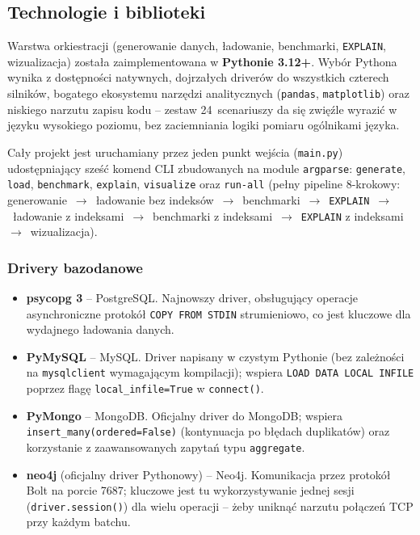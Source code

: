 \subsection{Technologie i biblioteki}

Warstwa orkiestracji (generowanie danych, ładowanie, benchmarki, \texttt{EXPLAIN},
wizualizacja) została zaimplementowana w \textbf{Pythonie 3.12+}. Wybór Pythona
wynika z dostępności natywnych, dojrzałych driverów do wszystkich czterech silników,
bogatego ekosystemu narzędzi analitycznych (\texttt{pandas}, \texttt{matplotlib})
oraz niskiego narzutu zapisu kodu -- zestaw 24~scenariuszy da się zwięźle wyrazić
w języku wysokiego poziomu, bez zaciemniania logiki pomiaru ogólnikami języka.

Cały projekt jest uruchamiany przez jeden punkt wejścia (\texttt{main.py}) udostępniający
sześć komend CLI zbudowanych na module \texttt{argparse}: \texttt{generate},
\texttt{load}, \texttt{benchmark}, \texttt{explain}, \texttt{visualize} oraz
\texttt{run-all} (pełny pipeline 8-krokowy: generowanie~$\rightarrow$~ładowanie
bez indeksów~$\rightarrow$~benchmarki~$\rightarrow$~\texttt{EXPLAIN}~$\rightarrow$~ładowanie
z indeksami~$\rightarrow$~benchmarki z indeksami~$\rightarrow$~\texttt{EXPLAIN} z
indeksami~$\rightarrow$~wizualizacja).

\subsubsection*{Drivery bazodanowe}

\begin{itemize}
    \item \textbf{psycopg 3} -- PostgreSQL. Najnowszy driver, obsługujący operacje asynchroniczne  
    protokół \texttt{COPY FROM STDIN} strumieniowo,
    co jest kluczowe dla wydajnego ładowania danych.
    \item \textbf{PyMySQL} -- MySQL. Driver napisany w czystym Pythonie (bez zależności na
    \texttt{mysqlclient} wymagającym kompilacji); wspiera \texttt{LOAD DATA LOCAL INFILE}
    poprzez flagę \texttt{local\_infile=True} w \texttt{connect()}.
    \item \textbf{PyMongo} -- MongoDB. Oficjalny driver do MongoDB; wspiera
    \texttt{insert\_many(ordered=False)} (kontynuacja po błędach duplikatów) oraz
    korzystanie z zaawansowanych zapytań typu \texttt{aggregate}.
    \item \textbf{neo4j} (oficjalny driver Pythonowy) -- Neo4j. Komunikacja przez
    protokół Bolt na porcie 7687; kluczowe jest tu wykorzystywanie jednej sesji
    (\texttt{driver.session()}) dla wielu operacji -- żeby uniknąć narzutu połączeń TCP przy każdym batchu.
\end{itemize}

